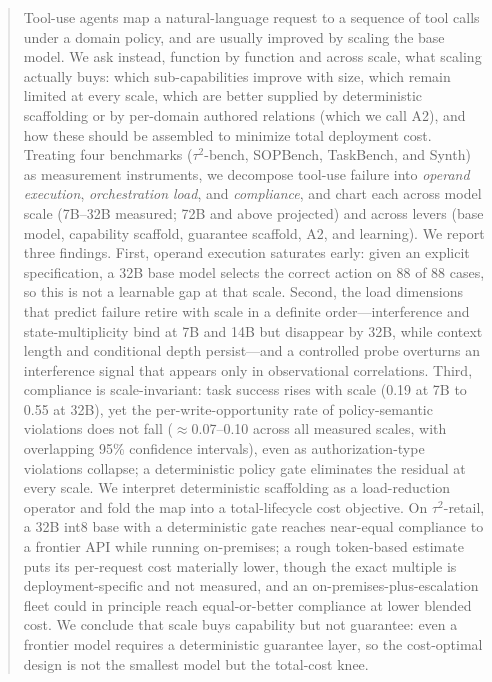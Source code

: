 \begin{abstract}
Tool-use agents map a natural-language request to a sequence of tool calls under a domain policy, and are usually improved by scaling the base model. We ask instead, function by function and across scale, what scaling actually buys: which sub-capabilities improve with size, which remain limited at every scale, which are better supplied by deterministic scaffolding or by per-domain authored relations (which we call A2), and how these should be assembled to minimize total deployment cost. Treating four benchmarks ($\tau^2$-bench, SOPBench, TaskBench, and Synth) as measurement instruments, we decompose tool-use failure into \emph{operand execution}, \emph{orchestration load}, and \emph{compliance}, and chart each across model scale (7B--32B measured; 72B and above projected) and across levers (base model, capability scaffold, guarantee scaffold, A2, and learning). We report three findings. First, operand execution saturates early: given an explicit specification, a 32B base model selects the correct action on 88 of 88 cases, so this is not a learnable gap at that scale. Second, the load dimensions that predict failure retire with scale in a definite order---interference and state-multiplicity bind at 7B and 14B but disappear by 32B, while context length and conditional depth persist---and a controlled probe overturns an interference signal that appears only in observational correlations. Third, compliance is scale-invariant: task success rises with scale (0.19 at 7B to 0.55 at 32B), yet the per-write-opportunity rate of policy-semantic violations does not fall ($\approx$0.07--0.10 across all measured scales, with overlapping 95\% confidence intervals), even as authorization-type violations collapse; a deterministic policy gate eliminates the residual at every scale. We interpret deterministic scaffolding as a load-reduction operator and fold the map into a total-lifecycle cost objective. On $\tau^2$-retail, a 32B int8 base with a deterministic gate reaches near-equal compliance to a frontier API while running on-premises; a rough token-based estimate puts its per-request cost materially lower, though the exact multiple is deployment-specific and not measured, and an on-premises-plus-escalation fleet could in principle reach equal-or-better compliance at lower blended cost. We conclude that scale buys capability but not guarantee: even a frontier model requires a deterministic guarantee layer, so the cost-optimal design is not the smallest model but the total-cost knee.
\end{abstract}
